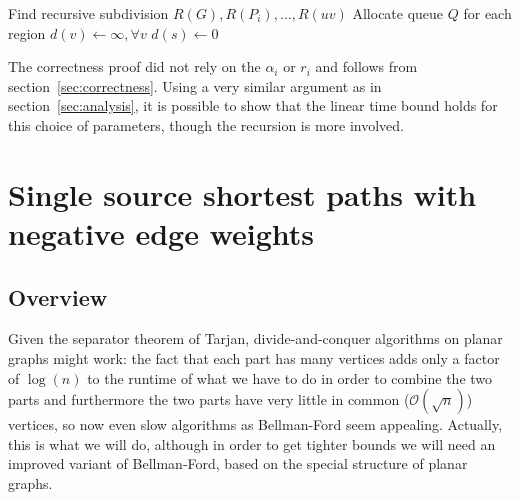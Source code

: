 \documentclass[11pt]{article}
\begin{document}
\begin{algorithm}
  \begin{algorithmic}[1]
    \State Find recursive subdivision $R(G), R(P_i), \ldots, R(uv)$
    \State Allocate queue $Q$ for each region
    \State $d(v) \gets \infty, \forall v$
    \State $d(s) \gets 0$
      \State {}
    \EndFor
      \State {}
    \EndWhile
  \end{algorithmic}
\end{algorithm}


The correctness proof did not rely on the $\alpha_i$ or $r_i$ and follows from section~\ref{sec:correctness}. Using a very similar argument as in section~\ref{sec:analysis}, it is possible to show that the linear time bound holds for this choice of parameters, though the recursion is more involved.

\section{Single source shortest paths with negative edge weights}
\label{sec:arbitr-edge-weights}

\subsection{Overview}
\label{sec: overview}

Given the separator theorem of Tarjan, divide-and-conquer algorithms on planar graphs might work: the fact that each part has many vertices adds only a factor of $\log(n)$ to the runtime of what we have to do in order to combine the two parts and furthermore the two parts have very little in common ($\mathcal{O}(\sqrt{n})$) vertices, so now even slow algorithms as Bellman-Ford seem appealing. Actually, this is what we will do, although in order to get tighter bounds we will need an improved variant of Bellman-Ford, based on the special structure of planar graphs.
\end{document}
